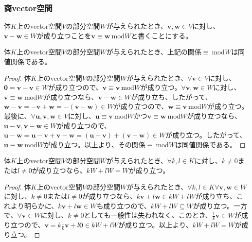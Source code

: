 \documentclass[dvipdfmx]{jsarticle}
\begin{document}
\subsubsection{商vector空間}%
\begin{dfn}
体$K$上のvector空間$V$の部分空間$W$が与えられたとき、$\mathbf{v},\mathbf{w} \in V$に対し、$\mathbf{v} - \mathbf{w} \in W$が成り立つことを$\mathbf{v} \equiv \mathbf{w}\ \mathrm{mod}W$と書くことにする。
\end{dfn}
\begin{thm}\label{2.4.1.8}
体$K$上のvector空間$V$の部分空間$W$が与えられたとき、上記の関係$\equiv \ \mathrm{mod}W$は同値関係である。
\end{thm}
\begin{proof}
体$K$上のvector空間$V$の部分空間$W$が与えられたとき、$\forall\mathbf{v} \in V$に対し、$\mathbf{0} = \mathbf{v} - \mathbf{v} \in W$が成り立つので、$\mathbf{v} \equiv \mathbf{v}\ \mathrm{mod}W$が成り立つ。$\forall\mathbf{v},\mathbf{w} \in W$に対し、$\mathbf{v} \equiv \mathbf{w}\ \mathrm{mod}W$が成り立つなら、$\mathbf{v} - \mathbf{w} \in W$が成り立ち、したがって、$\mathbf{w} - \mathbf{v} = - \mathbf{v} + \mathbf{w} = - \left( \mathbf{v} - \mathbf{w} \right) \in W$が成り立つので、$\mathbf{w} \equiv \mathbf{v}\ \mathrm{mod}W$が成り立つ。最後に、$\forall\mathbf{u},\mathbf{v},\mathbf{w} \in V$に対し、$\mathbf{u} \equiv \mathbf{v}\ \mathrm{mod}W$かつ$\mathbf{v} \equiv \mathbf{w}\ \mathrm{mod}W$が成り立つなら、$\mathbf{u} - \mathbf{v},\mathbf{v} - \mathbf{w} \in W$が成り立つので、$\mathbf{u} - \mathbf{w} = \mathbf{u} - \mathbf{v} + \mathbf{v} - \mathbf{w} = \left( \mathbf{u} - \mathbf{v} \right) + \left( \mathbf{v} - \mathbf{w} \right) \in W$が成り立つ。したがって、$\mathbf{u} \equiv \mathbf{w}\ \mathrm{mod}W$が成り立つ。以上より、その関係$\equiv \ \mathrm{mod}W$は同値関係である。
\end{proof}
\begin{thm}\label{2.4.1.9}
体$K$上のvector空間$V$の部分空間$W$が与えられたとき、$\forall k,l \in K$に対し、$k \neq 0$または$l \neq 0$が成り立つなら、$kW + lW = W$が成り立つ。
\end{thm}
\begin{proof}
体$K$上のvector空間$V$の部分空間$W$が与えられたとき、$\forall k,l \in K\forall\mathbf{v},\mathbf{w} \in W$に対し、$k \neq 0$または$l \neq 0$が成り立つなら、$k\mathbf{v} + l\mathbf{w} \in kW + lW$が成り立ち、これより明らかに、$k\mathbf{v} + l\mathbf{w} \in W$も成り立つので、$kW + lW \subseteq W$が成り立つ。一方で、$\forall\mathbf{v} \in W$に対し、$k \neq 0$としても一般性は失われなく、このとき、$\frac{1}{k}\mathbf{v} \in W$が成り立つので、$\mathbf{v} = k\frac{1}{k}\mathbf{v} + l\mathbf{0} \in kW + lW$が成り立つ。以上より、$kW + lW = W$が成り立つ。
\end{proof}
\end{document}
